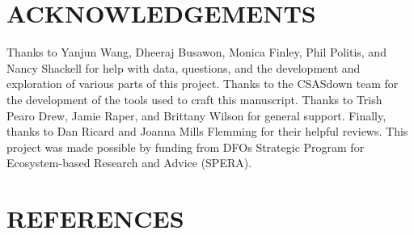 \documentclass[
]{article}
\begin{document}
\hypertarget{acknowledgements}{%
\section{ACKNOWLEDGEMENTS}\label{acknowledgements}}

Thanks to Yanjun Wang, Dheeraj Busawon, Monica Finley, Phil Politis, and Nancy Shackell for help with data, questions, and the development and exploration of various parts of this project. Thanks to the CSASdown team for the development of the tools used to craft this manuscript. Thanks to Trish Pearo Drew, Jamie Raper, and Brittany Wilson for general support. Finally, thanks to Dan Ricard and Joanna Mills Flemming for their helpful reviews. This project was made possible by funding from DFOs Strategic Program for Ecosystem-based Research and Advice (SPERA).

\clearpage

\newpage

\hypertarget{references}{%
\section*{REFERENCES}\label{references}}
\end{document}
